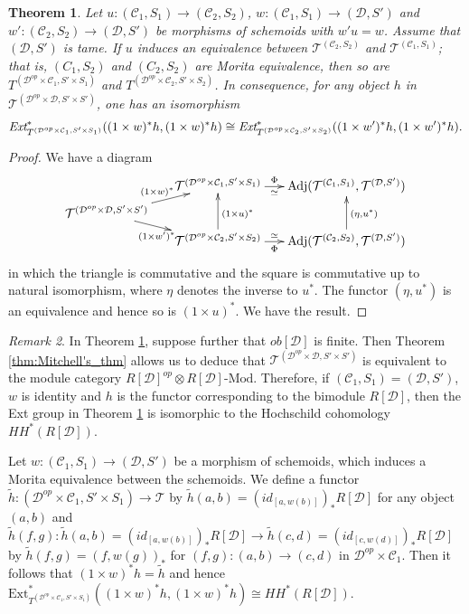 \documentclass{amsart}
\newtheorem{thm}{Theorem}[section]
\theoremstyle{definition}
\theoremstyle{remark}
\newtheorem{rem}[thm]{Remark}
\newcommand{\K}{R}%
\newcommand{\C}{{\mathcal C}}
\newcommand{\T}{{\mathcal T}}
\newcommand{\D}{\mathcal{D}}
\begin{document}
\begin{thm}\label{thm:Ext}
Let $u : (\C_1, S_1) \to (\C_2, S_2)$, $w : (\C_1, S_1) \to (\D, S')$ and $w' : (\C_2, S_2) \to (\D, S')$ be 
morphisms of schemoids with $w'u = w$. Assume that $(\D, S')$ is tame. 
If $u$ induces an equivalence between $\T^{(\C_2, S_2)}$ and 
$\T^{(\C_1, S_1)}$; that is, $(C_1, S_2)$ and $(C_2, S_2)$ are Morita equivalence, then so are 
$T^{(\D^{op}\times \C_1, S'\times S_1)}$ and $T^{(\D^{op}\times \C_2, S'\times S_2)}$. In consequence, 
for any object $h$ in $\T^{(\D^{op}\times \D, S'\times S')}$, 
one has an isomorphism
$$
\text{\em Ext}^*_{T^{(\D^{op}\times \C_1, S'\times S_1)}}((1\times w)^*h, (1\times w)^*h) \cong 
\text{\em Ext}^*_{T^{(\D^{op}\times \C_2, S'\times S_2)}}((1\times w')^*h, (1\times w')^*h).
$$
\end{thm}

\begin{proof}
We have a diagram 
$$
\xymatrix@C15pt@R5pt{ & \T^{(\D^{op}\times \C_1, S'\times S_1)} \ar[r]^-\Phi_-{\simeq} & \text{Adj}(\T^{(\C_1, S_1)}, \T^{(\D, S')})\\ 
\T^{(\D^{op}\times \D, S'\times S')} \ar[ru]^{(1\times w)^*} \ar[rd]_{(1\times w')^*}& \\
  & \T^{(\D^{op}\times \C_2, S'\times S_2)} \ar[uu]_{(1\times u)^*} \ar[r]_-{\Phi}^-{\simeq}& \text{Adj}(\T^{(\C_2, S_2)}, \T^{(\D, S')}) 
  \ar[uu]_{(\eta, u^*)}
}
$$
in which the triangle is commutative and the square is commutative up to natural isomorphism, 
where $\eta$ denotes the inverse to $u^*$. The functor $(\eta, u^*)$ is an equivalence and hence so is $(1\times u)^*$. 
We have the result. 
\end{proof}

\begin{rem}
In Theorem \ref{thm:Ext}, suppose further that $ob[\D]$ is finite. Then Theorem \ref{thm:Mitchell's_thm} allows us to deduce that  $\T^{(\D^{op}\times \D, S'\times S')}$ is equivalent to the module category $\K[\D]^{op}\otimes \K[\D]\text{-Mod}$.  
Therefore, if $(\C_1, S_1)=(\D, S')$, $w$ is identity and $h$ is the functor corresponding to the bimodule $\K[\D]$, then
the Ext group in Theorem  \ref{thm:Ext} is isomorphic to the Hochschild cohomology 
$HH^*(\K[\D])$. 

Let $w : (\C_1, S_1) \to (\D, S')$ be a morphism of schemoids, which induces a Morita equivalence between the schemoids. 
We define a functor $\widetilde{h} : (\D^{op}\times \C_1, S'\times S_1) \to \T$ by 
$\widetilde{h}(a, b) = (id_{[a ,w(b)]})_*\K[\D]$ for any object  $(a, b)$ and  
$\widetilde{h}(f, g) : \widetilde{h}(a, b) = (id_{[a ,w(b)]})_*\K[\D] \to \widetilde{h}(c, d) = (id_{[c ,w(d)]})_*\K[\D]$ by 
$\widetilde{h}(f, g)=(f, w(g))_*$ for $(f, g): (a, b) \to (c, d)$ in $\D^{op}\times \C_1$.  
Then it follows that $(1\times w)^*h = \widetilde{h}$ and hence  
$\text{Ext}^*_{T^{(\D^{op}\times \C_1, S'\times S_1)}}((1\times w)^*h, (1\times w)^*h) \cong  
HH^*(\K[\D])$. 
\end{rem}
\end{document}
